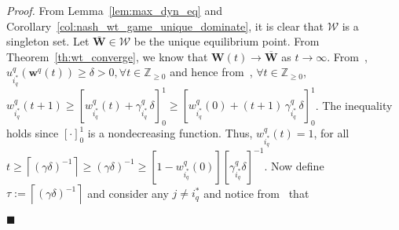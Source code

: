\documentclass{IEEEtran}
\newcommand{\ldef}{:=}
\newcommand{\Mcal}[1]{\mathcal{#1}}
\newcommand{\Mc}[1]{\mathcal{#1}}
\newcommand{\bld}[1]{\mathbf{#1}}
\newcommand{\integer}{\ensuremath{\mathbb{Z}}}
\newcommand{\real}{\ensuremath{\mathbb{R}}}
\newcommand{\squaresym}{\hbox{$\blacksquare$}}
\newcommand{\proofend}{\relax\ifmmode\else\unskip\hfill\fi\squaresym}
\renewenvironment{proof}{\textit{Proof.} }{\proofend}
\renewcommand{\bar}[1]{\overline{#1}}
\newcommand{\marginn}[1]{\marginpar{\color{blue}\tiny\ttfamily#1}}
\newcommand{\margin}[1]{\marginpar{\color{magenta}\tiny\ttfamily#1}}
\def \eqpt{\Mcal{W}}
\def \integer{\mathbb{Z}}
\def \intpos{\integer_{\geq 0}}
\def \real{\mathbb{R}}
\def \tsk{\Mc{Q}}
\def \w{\bld{w}}
\def \W{\bld{W}}
\def \Wb{\bar{\W}}
\begin{document}
\begin{proof}
  From Lemma~\ref{lem:max_dyn_eq} and
  Corollary~\ref{col:nash_wt_game_unique_dominate}, it is clear that
  $\eqpt$ is a singleton set. Let $ \Wb \in \eqpt$ be the unique
  equilibrium point. From Theorem~\ref{th:wt_converge}, we know that
  $\W(t) \to \Wb$ as $t \to \infty$. %
  From~,
    $u^q_{i^*_q}(\w^q(t)) \geq \delta > 0, %
    \forall t \in \intpos$
  and hence from~, $\forall t\in \intpos$,
    $w^q_{i^*_q}(t+1)
    \geq [ w^q_{i^*_q}(t) + \gamma^q_{i^*_q} \, \delta ]_0^1 \geq [ w^q_{i^*_q}(0) + (t+1)\, \gamma^q_{i^*_q} \, \delta ]_0^1$.
  The inequality holds since $[\cdot]_0^1$ is a nondecreasing function.
  Thus,
  $w^q_{i^*_q}(t) = 1$, for all
     $t \geq \left\lceil(\gamma\delta)^{-1} \right\rceil \geq (\gamma\delta)^{-1} \geq [1 - w^q_{i^*_q}(0)] [\gamma^q_{i^*_q} \delta]^{-1}$.
Now define $\tau \ldef \left\lceil(\gamma\delta)^{-1} \right\rceil$ and
consider any $j \neq i^*_q$ and notice from~ that

\end{proof}
\end{document}
